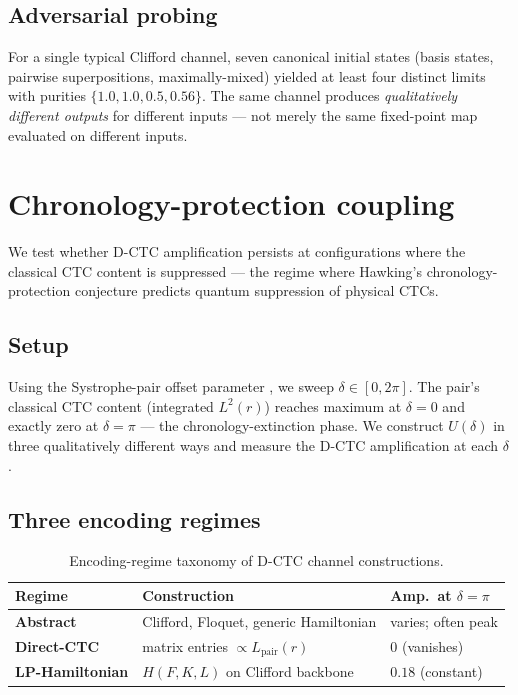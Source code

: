 \documentclass[11pt,a4paper]{article}
\begin{document}
\subsection{Adversarial probing}

For a single typical Clifford channel, seven canonical initial
states (basis states, pairwise superpositions, maximally-mixed)
yielded at least four distinct limits with purities
$\{1.0, 1.0, 0.5, 0.56\}$. The same channel produces
\emph{qualitatively different outputs} for different inputs --- not
merely the same fixed-point map evaluated on different inputs.

\section{Chronology-protection coupling}

We test whether D-CTC amplification persists at configurations where
the classical CTC content is suppressed --- the regime where
Hawking's chronology-protection conjecture \cite{Hawking1992}
predicts quantum suppression of physical CTCs.

\subsection{Setup}

Using the Systrophe-pair offset parameter
\cite{Knopp2026Systrophe}, we sweep $\delta \in [0, 2\pi]$.
The pair's classical CTC content (integrated $L^2(r)$) reaches
maximum at $\delta = 0$ and exactly zero at $\delta = \pi$ ---
the chronology-extinction phase. We construct $U(\delta)$ in three
qualitatively different ways and measure the D-CTC amplification at
each $\delta$.

\subsection{Three encoding regimes}

\begin{table}[h]
\centering
\caption{Encoding-regime taxonomy of D-CTC channel constructions.}
\label{tab:trichotomy}
\begin{tabular}{lll}
\toprule
Regime & Construction & Amp.\ at $\delta = \pi$ \\
\midrule
\textbf{Abstract} & Clifford, Floquet, generic Hamiltonian & varies; often peak \\
\textbf{Direct-CTC} & matrix entries $\propto L_{\text{pair}}(r)$ & $0$ (vanishes) \\
\textbf{LP-Hamiltonian} & $H(F, K, L)$ on Clifford backbone & $0.18$ (constant) \\
\bottomrule
\end{tabular}
\end{table}
\end{document}
